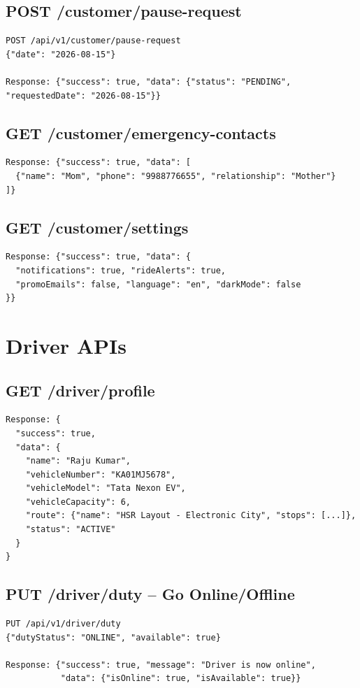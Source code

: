 \documentclass[11pt,a4paper]{article}
\begin{document}
\subsection{POST /customer/pause-request}
\begin{lstlisting}
POST /api/v1/customer/pause-request
{"date": "2026-08-15"}

Response: {"success": true, "data": {"status": "PENDING", "requestedDate": "2026-08-15"}}
\end{lstlisting}

\subsection{GET /customer/emergency-contacts}
\begin{lstlisting}
Response: {"success": true, "data": [
  {"name": "Mom", "phone": "9988776655", "relationship": "Mother"}
]}
\end{lstlisting}

\subsection{GET /customer/settings}
\begin{lstlisting}
Response: {"success": true, "data": {
  "notifications": true, "rideAlerts": true,
  "promoEmails": false, "language": "en", "darkMode": false
}}
\end{lstlisting}

\section{Driver APIs}

\subsection{GET /driver/profile}
\begin{lstlisting}
Response: {
  "success": true,
  "data": {
    "name": "Raju Kumar",
    "vehicleNumber": "KA01MJ5678",
    "vehicleModel": "Tata Nexon EV",
    "vehicleCapacity": 6,
    "route": {"name": "HSR Layout - Electronic City", "stops": [...]},
    "status": "ACTIVE"
  }
}
\end{lstlisting}

\subsection{PUT /driver/duty -- Go Online/Offline}
\begin{lstlisting}
PUT /api/v1/driver/duty
{"dutyStatus": "ONLINE", "available": true}

Response: {"success": true, "message": "Driver is now online",
           "data": {"isOnline": true, "isAvailable": true}}
\end{lstlisting}
\end{document}
